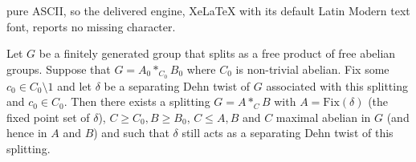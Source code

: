 \documentclass[10pt,a4paper]{amsart}
\begin{document}
pure ASCII, so the delivered engine, XeLaTeX with its default Latin Modern text font, reports no missing character.
\begin{thm}
    \label{lemma: enlarging the splitting in separating case}
    Let $G$ be a finitely generated group that splits as a free product of free abelian groups. Suppose that $G = A_0 *_{C_0} B_0$ where $C_0$ is non-trivial abelian. Fix some $c_{0} \in C_0 \setminus 1$ and let $\delta$ be a separating Dehn twist of $G$ associated with this splitting and $c_0 \in C_0$. Then there exists a splitting $G = A *_C B$ with $A = \mathrm{Fix}(\delta)$ (the fixed point set of $\delta$), $C \geq C_0, B \geq B_0$, $C \leq A, B$ and $C$ maximal abelian in $G$ (and hence in $A$ and $B$) and such that $\delta$ still acts as a separating Dehn twist of this splitting. 
\end{thm}
\end{document}

